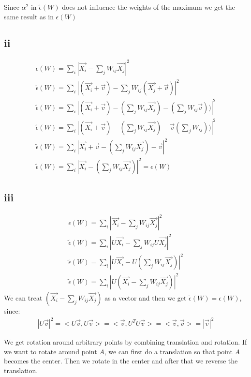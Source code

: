 \documentclass[11pt,a4paper]{article}
\begin{document}
Since $\alpha^2$ in $\tilde{\epsilon}(W)$ does not influence the weights of the maximum we get the same result as in ${\epsilon}(W)$

\subsection*{ii}

\begin{gather*}
\epsilon(W) = \sum_{i} |\vec{X_{i}} - \sum_j W_{ij} \vec{X_{j}}| ^{2} \\
\tilde{\epsilon}(W) = \sum_{i} |(\vec{X_{i}} + \vec{v}) - \sum_j W_{ij}  (\vec{X_{j}} + \vec{v})| ^{2} \\
\tilde{\epsilon}(W) = \sum_{i} |(\vec{X_{i}} + \vec{v}) - (\sum_j W_{ij} \vec{X_{j}}) - (\sum_j W_{ij} \vec{v}))| ^{2} \\
\tilde{\epsilon}(W) = \sum_{i} |(\vec{X_{i}} + \vec{v}) - (\sum_j W_{ij} \vec{X_{j}}) - \vec{v} (\sum_j W_{ij}))| ^{2} \\
\tilde{\epsilon}(W) = \sum_{i} |\vec{X_{i}} + \vec{v} - (\sum_j W_{ij} \vec{X_{j}}) - \vec{v}| ^{2} \\
\tilde{\epsilon}(W) = \sum_{i} |\vec{X_{i}} - (\sum_j W_{ij} \vec{X_{j}})| ^{2} = \epsilon(W)
\end{gather*}

\subsection*{iii}

\begin{gather*}
\epsilon(W) = \sum_{i} |\vec{X_{i}} - \sum_j W_{ij} \vec{X_{j}}| ^{2} \\
\tilde{\epsilon}(W) = \sum_{i} |U\vec{X_{i}} - \sum_j W_{ij} U\vec{X_{j}}| ^{2} \\
\tilde{\epsilon}(W) = \sum_{i} |U\vec{X_{i}} - U(\sum_j W_{ij} \vec{X_{j}})| ^{2} \\
\tilde{\epsilon}(W) = \sum_{i} |U(\vec{X_{i}} - \sum_j W_{ij} \vec{X_{j}})| ^{2}
\end{gather*}
We can treat $(\vec{X_{i}} - \sum_j W_{ij} \vec{X_{j}})$ as a vector and then we get $\tilde{\epsilon}(W) = \epsilon(W)$, since:
\begin{gather*}
|U\vec{v}|^2 = <U\vec{v}, U\vec{v}> = <\vec{v}, U^T U\vec{v}> = <\vec{v}, \vec{v}> = |\vec{v}|^2
\end{gather*}

We get rotation around arbitrary points by combining translation and rotation. If we want to rotate around point $A$, we can first do a translation so that point $A$ becomes the center. Then we rotate in the center and after that we reverse the translation.
\end{document}
